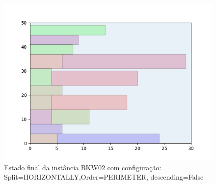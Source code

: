 \begin{figure}[H]
    \centering
    \caption[]{Estado final da instância BKW02 com configuração: Split=HORIZONTALLY,Order=PERIMETER, descending=False}
    \label{fig:bkw02-horizontally-perimeter-false}
    \includegraphics[scale=0.5]{output/figures/bkw/bkw02/horizontally/perimeter/false/00}
\end{figure}